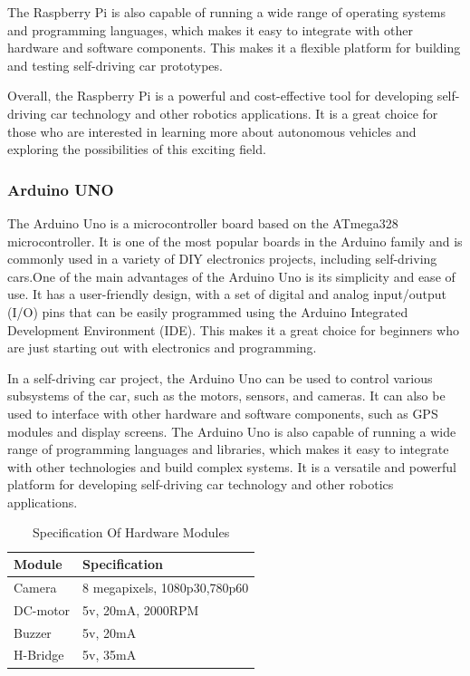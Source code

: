 \noindent
The Raspberry Pi is also capable of running a wide range of operating systems and programming languages, which makes it easy to integrate with other hardware and software components. This makes it a flexible platform for building and testing self-driving car prototypes.

\noindent
Overall, the Raspberry Pi is a powerful and cost-effective tool for developing self-driving car technology and other robotics applications. It is a great choice for those who are interested in learning more about autonomous vehicles and exploring the possibilities of this exciting field.
\subsubsection{Arduino UNO}
The Arduino Uno is a microcontroller board based on the ATmega328 microcontroller. It is one of the most popular boards in the Arduino family and is commonly used in a variety of DIY electronics projects, including self-driving cars.One of the main advantages of the Arduino Uno is its simplicity and ease of use. It has a user-friendly design, with a set of digital and analog input/output (I/O) pins that can be easily programmed using the Arduino Integrated Development Environment (IDE). This makes it a great choice for beginners who are just starting out with electronics and programming.

\noindent
In a self-driving car project, the Arduino Uno can be used to control various subsystems of the car, such as the motors, sensors, and cameras. It can also be used to interface with other hardware and software components, such as GPS modules and display screens. The Arduino Uno is also capable of running a wide range of programming languages and libraries, which makes it easy to integrate with other technologies and build complex systems. It is a versatile and powerful platform for developing self-driving car technology and other robotics applications.
\begin{table}[H]
\centering
\begin{tabular}{|l|l|}
\hline
\textbf{Module} & \textbf{Specification}       \\ \hline
Camera          & 8 megapixels, 1080p30,780p60 \\ \hline
DC-motor        & 5v, 20mA, 2000RPM            \\ \hline
Buzzer          & 5v, 20mA                     \\ \hline
H-Bridge        & 5v, 35mA                     \\ \hline
\end{tabular}
\caption{Specification Of Hardware Modules}
\label{tab:hardwarecomp}
\end{table}
